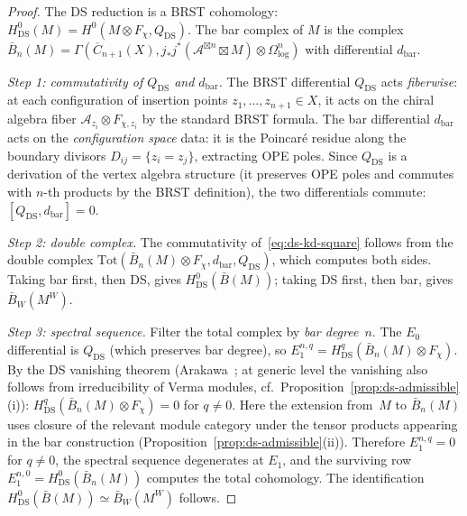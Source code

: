 \begin{proof}
The DS reduction is a BRST cohomology:
$H^0_{\mathrm{DS}}(M) = H^0(M \otimes F_\chi, Q_{\mathrm{DS}})$.
The bar complex of $M$ is the complex
$\bar{B}_n(M) = \Gamma(\overline{C}_{n+1}(X),
j_*j^*(\mathcal{A}^{\boxtimes n} \boxtimes M)
\otimes \Omega^n_{\log})$
with differential $d_{\mathrm{bar}}$.

\emph{Step 1: commutativity of $Q_{\mathrm{DS}}$ and $d_{\mathrm{bar}}$.}
The BRST differential $Q_{\mathrm{DS}}$ acts \emph{fiberwise}: at each
configuration of insertion points $z_1, \ldots, z_{n+1} \in X$, it
acts on the chiral algebra fiber $\mathcal{A}_{z_i} \otimes F_{\chi,z_i}$
by the standard BRST formula.  The bar differential $d_{\mathrm{bar}}$
acts on the \emph{configuration space} data: it is the Poincar\'e
residue along the boundary divisors $D_{ij} = \{z_i = z_j\}$,
extracting OPE poles.  Since $Q_{\mathrm{DS}}$ is a derivation of the
vertex algebra structure (it preserves OPE poles and commutes with
$n$-th products by the BRST definition), the two differentials
commute: $[Q_{\mathrm{DS}}, d_{\mathrm{bar}}] = 0$.

\emph{Step 2: double complex.}
The commutativity of~\eqref{eq:ds-kd-square} follows from the
double complex
$\mathrm{Tot}(\bar{B}_n(M) \otimes F_\chi, d_{\mathrm{bar}},
Q_{\mathrm{DS}})$, which computes both sides.
Taking bar first, then DS, gives
$H^0_{\mathrm{DS}}(\bar{B}(M))$; taking DS first, then bar,
gives $\bar{B}_W(M^W)$.

\emph{Step 3: spectral sequence.}
Filter the total complex by \emph{bar degree}~$n$.
The $E_0$ differential is $Q_{\mathrm{DS}}$ (which preserves
bar degree), so
$E_1^{n,q} = H^q_{\mathrm{DS}}(\bar{B}_n(M) \otimes F_\chi)$.
By the DS vanishing theorem
\textup{(}Arakawa~\textup{\cite{Ara07}};
at generic level the vanishing also follows from irreducibility
of Verma modules,
cf.\ Proposition~\textup{\ref{prop:ds-admissible}(i)}\textup{)}:
$H^q_{\mathrm{DS}}(\bar{B}_n(M) \otimes F_\chi) = 0$ for
$q \neq 0$.  Here the extension from~$M$ to $\bar{B}_n(M)$
uses closure of the relevant module category under the tensor
products appearing in the bar construction
(Proposition~\ref{prop:ds-admissible}(ii)).
Therefore $E_1^{n,q} = 0$ for $q \neq 0$, the spectral
sequence degenerates at $E_1$, and the surviving row
$E_1^{n,0} = H^0_{\mathrm{DS}}(\bar{B}_n(M))$ computes
the total cohomology.  The identification
$H^0_{\mathrm{DS}}(\bar{B}(M)) \simeq \bar{B}_W(M^W)$
follows.
\end{proof}

